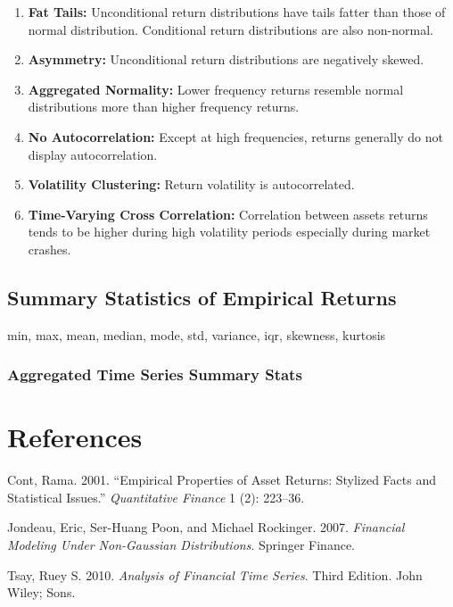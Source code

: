 \documentclass[11pt,]{article}
\providecommand{\tightlist}{%
  \setlength{\itemsep}{0pt}\setlength{\parskip}{0pt}}
\begin{document}
\begin{enumerate}
\def\labelenumi{\arabic{enumi}.}
\tightlist
\item
  \textbf{Fat Tails:} Unconditional return distributions have tails
  fatter than those of normal distribution. Conditional return
  distributions are also non-normal.
\item
  \textbf{Asymmetry:} Unconditional return distributions are negatively
  skewed.
\item
  \textbf{Aggregated Normality:} Lower frequency returns resemble normal
  distributions more than higher frequency returns.
\item
  \textbf{No Autocorrelation:} Except at high frequencies, returns
  generally do not display autocorrelation.
\item
  \textbf{Volatility Clustering:} Return volatility is autocorrelated.
\item
  \textbf{Time-Varying Cross Correlation:} Correlation between assets
  returns tends to be higher during high volatility periods especially
  during market crashes.
\end{enumerate}

\subsection{Summary Statistics of Empirical
Returns}\label{summary-statistics-of-empirical-returns}

min, max, mean, median, mode, std, variance, iqr, skewness, kurtosis

\subsubsection{Aggregated Time Series Summary
Stats}\label{aggregated-time-series-summary-stats}

\section*{References}\label{references}

\hypertarget{refs}{}
\hypertarget{ref-Cont:2001}{}
Cont, Rama. 2001. ``Empirical Properties of Asset Returns: Stylized
Facts and Statistical Issues.'' \emph{Quantitative Finance} 1 (2):
223--36.

\hypertarget{ref-Jondeau_Poon_Rockinger:2007}{}
Jondeau, Eric, Ser-Huang Poon, and Michael Rockinger. 2007.
\emph{Financial Modeling Under Non-Gaussian Distributions}. Springer
Finance.

\hypertarget{ref-Tsay:2010}{}
Tsay, Ruey S. 2010. \emph{Analysis of Financial Time Series}. Third
Edition. John Wiley; Sons.
\end{document}
